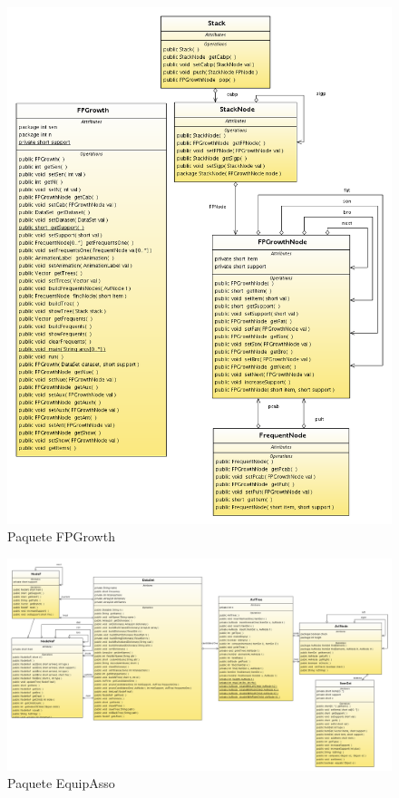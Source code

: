 \documentclass[letterpaper,12pt]{report}
\begin{document}
\begin{figure}
\centering
\includegraphics[width=1.5\textwidth]{FPGrowth.png}
\caption{Paquete FPGrowth}
\end{figure}
\newpage
\begin{figure}
\centering
\includegraphics[angle=90, width=1.1\textwidth]{EquipAsso.png}
\caption{Paquete EquipAsso}
\end{figure}
\end{document}
